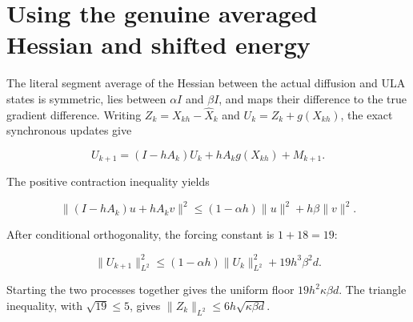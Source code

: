\documentclass[11pt,a4paper]{report}
\begin{document}
\section{\texorpdfstring{Using the genuine averaged Hessian and shifted energy}{Using the genuine averaged Hessian and shifted energy}}


The literal segment average of the Hessian between the actual
    diffusion and ULA states is symmetric, lies between \(\alpha I\) and
    \(\beta I\), and maps their difference to the true gradient difference.
    Writing \(Z_k=X_{kh}-\widehat X_k\) and \(U_k=Z_k+g(X_{kh})\),
    the exact synchronous updates give


    \[U_{k+1}=(I-hA_k)U_k+hA_kg(X_{kh})+M_{k+1}.\]


The positive contraction inequality yields


    \[\|(I-hA_k)u+hA_kv\|^2
      \le(1-\alpha h)\|u\|^2+h\beta\|v\|^2.\]


After conditional orthogonality, the forcing constant is
    \(1+18=19\):


    \[\|U_{k+1}\|_{L^2}^2
      \le(1-\alpha h)\|U_k\|_{L^2}^2+19h^3\beta^2d.\]


Starting the two processes together gives the uniform floor
    \(19h^2\kappa\beta d\). The triangle inequality, with
    \(\sqrt{19}\le5\), gives
    \(\|Z_k\|_{L^2}\le6h\sqrt{\kappa\beta d}\).
\end{document}
